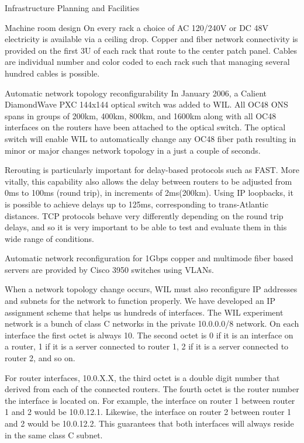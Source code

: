 \documentclass{IEEEtran}
\begin{document}
\begin{section}{Infrastructure Planning and Facilities}
\begin{subsection}{Machine room design}
On every rack a choice of AC 120/240V or DC 48V electricity is available
via a ceiling drop. Copper and fiber network connectivity is provided on
the first 3U of each rack that route to the center patch panel. Cables
are individual number and color coded to each rack such that managing
several hundred cables is possible.
\end{subsection}

\begin{subsection}{Automatic network topology reconfigurability}
In January 2006, a Calient DiamondWave PXC 144x144 optical switch was
added to WIL. All OC48 ONS spans in groups of 200km, 400km, 800km,
and 1600km along with all OC48 interfaces on the routers have been
attached to the optical switch. The optical switch will enable WIL to
automatically change any OC48 fiber path resulting in minor or major
changes network topology in a just a couple of seconds.

Rerouting is particularly important for delay-based protocols such
as FAST.  More vitally, this capability also allows the delay between
routers to be adjusted from 0ms to 100ms (round trip), in increments
of 2ms(200km).  Using IP loopbacks, it is possible to achieve delays
up to 125ms, corresponding to trans-Atlantic distances.  TCP protocols
behave very differently depending on the round trip delays, and so it is
very important to be able to test and evaluate them in this wide range
of conditions.

Automatic network reconfiguration for 1Gbps copper and multimode fiber
based servers are provided by Cisco 3950 switches using VLANs.

When a network topology change occurs, WIL must also reconfigure
IP addresses and subnets for the network to function properly. We
have developed an IP assignment scheme that helps us hundreds of
interfaces. The WIL experiment network is a bunch of class C networks
in the private 10.0.0.0/8 network. On each interface the first octet
is always 10. The second octet is 0 if it is an interface on a router,
1 if it is a server connected to router 1, 2 if it is a server connected
to router 2, and so on.

For router interfaces, 10.0.X.X, the third octet is a double digit number
that derived from each of the connected routers.  The fourth octet is the
router number the interface is located on. For example, the interface
on router 1 between router 1 and 2 would be 10.0.12.1. Likewise, the
interface on router 2 between router 1 and 2 would be 10.0.12.2. This
guarantees that both interfaces will always reside in the same class
C subnet.


\end{subsection}
\end{section}
\end{document}
